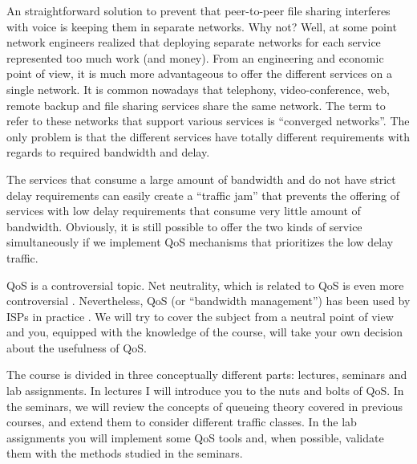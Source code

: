 An straightforward solution to prevent that peer-to-peer file sharing interferes with voice is keeping them in separate networks.
Why not? Well, at some point network engineers realized that deploying separate networks for each service represented too much work (and money).
From an engineering and economic point of view, it is much more advantageous to offer the different services on a single network.
It is common nowadays that telephony, video-conference, web, remote backup and file sharing services share the same network.
The term to refer to these networks that support various services is ``converged networks''.
The only problem is that the different services have totally different requirements with regards to required bandwidth and delay.

The services that consume a large amount of bandwidth and do not have strict delay requirements can easily create a ``traffic jam'' that prevents the offering of services with low delay requirements that consume very little amount of bandwidth.
Obviously, it is still possible to offer the two kinds of service simultaneously if we implement QoS mechanisms that prioritizes the low delay traffic.

QoS is a controversial topic.
Net neutrality, which is related to QoS is even more controversial \cite{bachula2006}.
Nevertheless, QoS (or ``bandwidth management'') has been used by ISPs in practice \cite{cooper2011bum}.
We will try to cover the subject from a neutral point of view and you, equipped with the knowledge of the course, will take your own decision about the usefulness of QoS.

The course is divided in three conceptually different parts: lectures, seminars and lab assignments.
In lectures I will introduce you to the nuts and bolts of QoS.
In the seminars, we will review the concepts of queueing theory covered in previous courses, and extend them to consider different traffic classes.
In the lab assignments you will implement some QoS tools and, when possible, validate them with the methods studied in the seminars.

